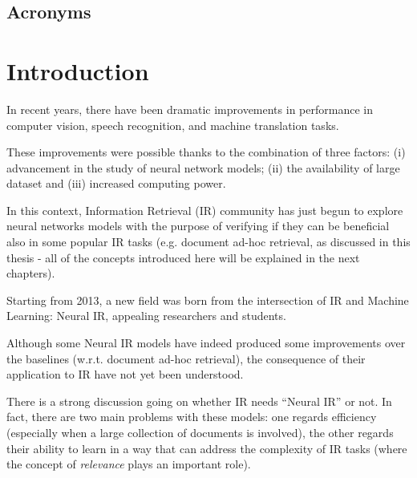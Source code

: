 \newpage
\begin{center}
\section*{Acronyms}
\begin{acronym}
\end{acronym}
\end{center}

\newpage
\chapter{Introduction}

In recent years, there have been dramatic improvements in performance in computer vision, speech recognition, and machine translation tasks.

These improvements were possible thanks to the combination of three factors: (i) advancement in the study of neural network models; (ii) the availability of large dataset and (iii) increased computing power.

In this context, Information Retrieval (IR) community has just begun to explore neural networks models with the purpose of verifying if they can be beneficial also in some popular IR tasks (e.g. document ad-hoc retrieval, as discussed in this thesis - all of the concepts introduced here will be explained in the next chapters).

Starting from 2013, a new field was born from the intersection of IR and Machine Learning: Neural IR, appealing researchers and students.

Although some Neural IR models have indeed produced some improvements over the baselines (w.r.t. document ad-hoc retrieval), the consequence of their application to IR have not yet been understood.

There is a strong discussion going on whether IR needs ``Neural IR'' or not. In fact, there are two main problems with these models: one regards efficiency (especially when a large collection of documents is involved), the other regards their ability to learn in a way that can address the complexity of IR tasks (where the concept of \textit{relevance} plays an important role).


